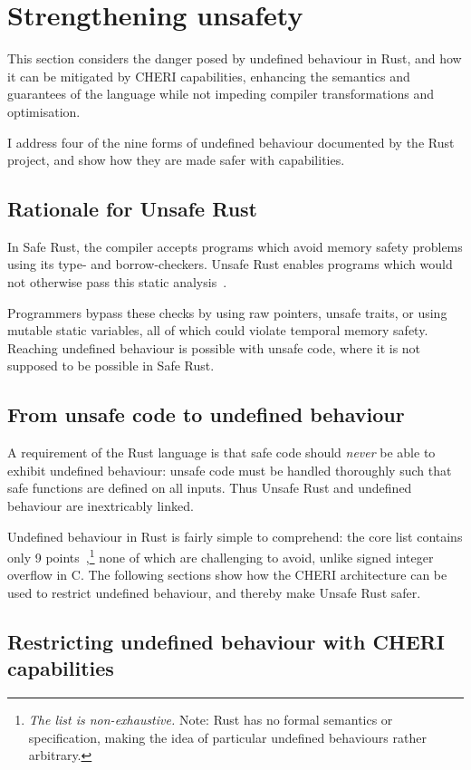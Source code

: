\documentclass[dissertation.tex]{subfiles}
\begin{document}
\section{Strengthening unsafety}
\label{sec:eval-betterunsafe}

This section considers the danger posed by undefined behaviour in Rust,
and how it can be mitigated by CHERI capabilities, enhancing the
semantics and guarantees of the language while not impeding compiler
transformations and optimisation.

I address four of the nine forms of undefined behaviour documented by
the Rust project, and show how they are made safer with capabilities.

\subsection{Rationale for Unsafe Rust}
In Safe Rust, the compiler accepts programs which avoid memory safety
problems using its type- and borrow-checkers.
Unsafe Rust enables programs which would not otherwise pass this static
analysis~\cite{rust-trpl-book}.

Programmers bypass these checks by using raw pointers, unsafe traits, or
using mutable static variables, all of which could violate temporal
memory safety.
Reaching undefined behaviour is possible with unsafe code, where it is
not supposed to be possible in Safe Rust.


\subsection{From unsafe code to undefined behaviour}
A requirement of the Rust language is that safe code should \emph{never}
be able to exhibit undefined behaviour: unsafe code must be handled
thoroughly such that safe functions are defined on all inputs.
Thus Unsafe Rust and undefined behaviour are inextricably linked.

Undefined behaviour in Rust is fairly simple to comprehend:
the core list contains only 9 points~\cite{rust-ref},\footnote{
\emph{The list is non-exhaustive.} Note: Rust has no formal
semantics or specification, making the idea of particular undefined
behaviours rather arbitrary.}
none of which are challenging to avoid, unlike signed integer overflow
in C.
The following sections show how the CHERI architecture can be used to
restrict undefined behaviour, and thereby make Unsafe Rust safer.


\subsection{Restricting undefined behaviour with CHERI capabilities}
\label{sec:eval-betterunsafe-reasons}
\end{document}
